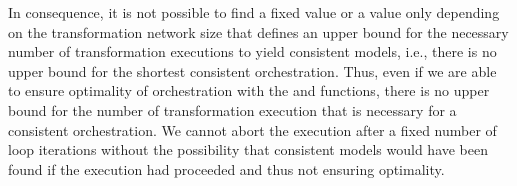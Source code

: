 In consequence, it is not possible to find a fixed value or a value only depending on the transformation network size that defines an upper bound for the necessary number of transformation executions to yield consistent models, i.e., there is no upper bound for the shortest consistent orchestration.
Thus, even if we are able to ensure optimality of orchestration with the  and  functions, there is no upper bound for the number of transformation execution that is necessary for a consistent orchestration.
We cannot abort the execution after a fixed number of loop iterations without the possibility that consistent models would have been found if the execution had proceeded and thus not ensuring optimality.





